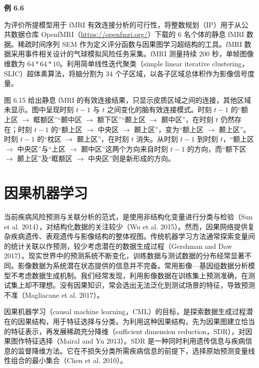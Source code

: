 \noindent\textbf{例 6.6}

为评价所提模型用于 fMRI 有效连接分析的可行性，将整数规划（IP）用于从公共数据仓库 OpenfMRI（\url{https://openfmri.org/}）下载的 6 名个体的静息 fMRI 数据。稀疏时间序列 SEM 作为定义评分函数与因果图学习超结构的工具。fMRI 数据采用事件相关设计的气球模拟风险任务采集。fMRI 测量持续 200 秒，单帧图像维数为 $64*64*10$。利用简单线性迭代聚类（simple linear iterative clustering，SLIC）超体素算法，将脑分割为 34 个子区域，以各子区域总体积作为影像信号度量。

图 6.15 给出静息 fMRI 的有效连接结果，只显示皮质区域之间的连接，其他区域未显示。图中呈现时刻 $t-1$ 与 $t$ 之间变化的脑有效连接模式。时刻 $t-1$ 的“额上区 $\to$ 眶额区”“颞中区 $\to$ 额下区”“颞上区 $\to$ 颞中区”，在时刻 $t$ 仍然存在；时刻 $t-1$ 的“额上区 $\to$ 中央区 $\to$ 颞上区”，变为“额上区 $\to$ 颞上区”。时刻 $t-1$ 的“枕区 $\to$ 颞上区”，在时刻 $t$ 消失。从时刻 $t-1$ 到时刻 $t$，“额上区 $\to$ 中央区”与“上区 $\to$ 颞中区”这两个方向来自时刻 $t-1$ 的方向，而“额下区 $\to$ 颞上区”及“眶额区 $\to$ 中央区”则是新形成的方向。


\section{因果机器学习}

当前疾病风险预测与关联分析的范式，是使用非结构化变量进行分类与检验（Sun et al. 2014），对结构化数据的关注较少（Wu et al. 2015）。然而，因果网络提供复杂疾病遗传、表观遗传与影像结构的整体视图。传统机器学习方法通常探索变量间的统计关联以作预测，较少考虑潜在的数据生成过程（Gershman and Daw 2017）。现实世界中的预测系统不断变化，训练数据与测试数据的分布经常显著不同。影像数据为系统潜在状态提供的信息并不完备。常用影像—基因组数据分析模型不考虑数据生成机制。我们经常发现，利用影像数据在训练集上预测准确，在测试集上却不理想。没有因果知识，常会选出无法泛化到测试场景的特征，导致预测不准（Magliacane et al. 2017）。

因果机器学习（causal machine learning，CML）的目标，是探索数据生成过程潜在的因果结构，用于特征选择与分类。为利用这种因果结构，先为因果图建立恰当的特征表示，再发展稀疏充分降维（sufficient dimension reduction，SDR），对因果图作特征选择（Mairal and Yu 2013）。SDR 是一种同时利用遗传信息与疾病信息的监督降维方法。它在不损失分类所需疾病信息的前提下，选择原始预测变量线性组合的最小集合（Chen et al. 2010）。

